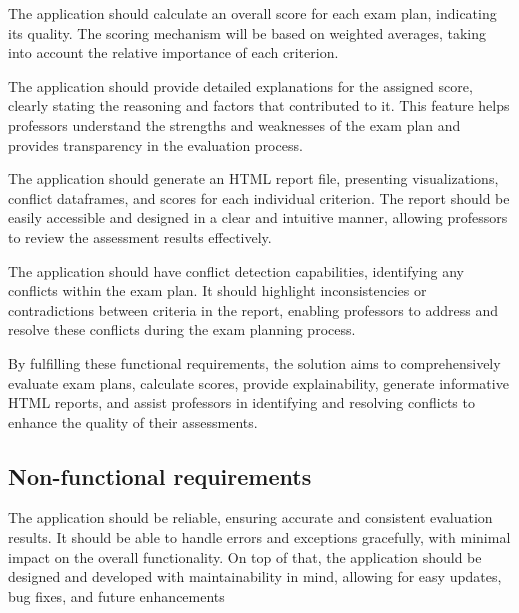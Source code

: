 \vspace{\baselineskip}


The application should calculate an overall score for each exam plan, indicating its quality. The scoring mechanism will be based on weighted averages, taking into account the relative importance of each criterion.

\vspace{\baselineskip}


The application should provide detailed explanations for the assigned score, clearly stating the reasoning and factors that contributed to it. This feature helps professors understand the strengths and weaknesses of the exam plan and provides transparency in the evaluation process.

\vspace{\baselineskip}


The application should generate an HTML report file, presenting visualizations, conflict dataframes, and scores for each individual criterion. The report should be easily accessible and designed in a clear and intuitive manner, allowing professors to review the assessment results effectively.

\vspace{\baselineskip}


The application should have conflict detection capabilities, identifying any conflicts within the exam plan. It should highlight inconsistencies or contradictions between criteria in the report, enabling professors to address and resolve these conflicts during the exam planning process.

\vspace{\baselineskip}


By fulfilling these functional requirements, the solution aims to comprehensively evaluate exam plans, calculate scores, provide explainability, generate informative HTML reports, and assist professors in identifying and resolving conflicts to enhance the quality of their assessments.


\subsection{Non-functional requirements}


The application should be reliable, ensuring accurate and consistent evaluation results. It should be able to handle errors and exceptions gracefully, with minimal impact on the overall functionality. On top of that, the application should be designed and developed with maintainability in mind, allowing for easy updates, bug fixes, and future enhancements